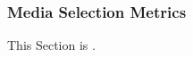 \KNEADSUBSUBSECTIONNEWPAGE
\subsubsection{Media Selection Metrics}
\label{lab:sssec_MediaSelectionMetrics_SysQual}

This Section is \TBD.

